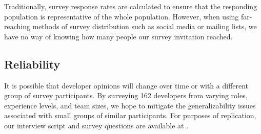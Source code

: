 Traditionally, survey response rates are calculated to ensure that the responding population is representative of the whole population. However, when using far-reaching methods of survey distribution such as social media or mailing lists, we have no way of knowing how many people our survey invitation reached.

\subsection{Reliability}
It is possible that developer opinions will change over time or with a different group of survey participants. By surveying 162 developers from varying roles, experience levels, and team sizes, we hope to mitigate the generalizability issues associated with small groups of similar participants.
For purposes of replication, our interview script and survey questions are available at \cite{companion_site}. 

